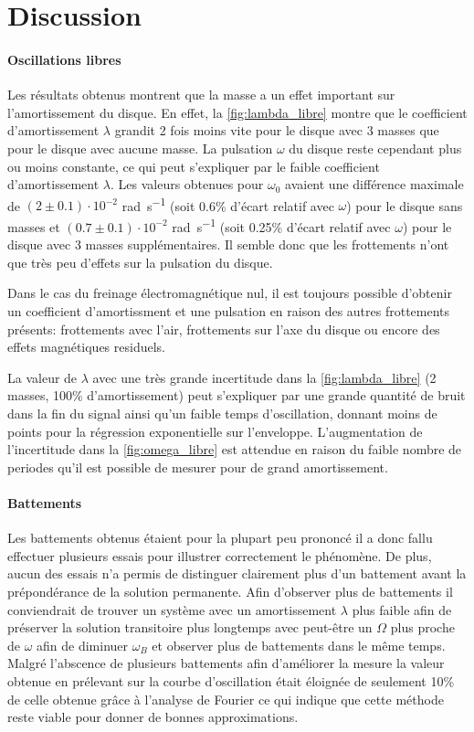 \section{Discussion}

\paragraph{Oscillations libres}
Les résultats obtenus montrent que la masse a un effet important sur l'amortissement du disque. En effet, la \autoref{fig:lambda_libre} montre que le coefficient d'amortissement \(\lambda\) grandit 2 fois moins vite pour le disque avec 3 masses que pour le disque avec aucune masse. La pulsation \(\omega\) du disque reste cependant plus ou moins constante, ce qui peut s'expliquer par le faible coefficient d'amortissement \(\lambda\). Les valeurs obtenues pour \(\omega_0\) avaient une différence maximale de \((2 \pm 0.1) \cdot 10^{-2}\) \si{\radian\per\second} (soit 0.6\% d'écart relatif avec \(\omega\)) pour le disque sans masses et \((0.7 \pm 0.1) \cdot 10^{-2}\) \si{\radian\per\second} (soit 0.25\% d'écart relatif avec \(\omega\)) pour le disque avec 3 masses supplémentaires. Il semble donc que les frottements n'ont que très peu d'effets sur la pulsation du disque.

Dans le cas du freinage électromagnétique nul, il est toujours possible d'obtenir un coefficient d'amortissment et une pulsation en raison des autres frottements présents: frottements avec l'air, frottements sur l'axe du disque ou encore des effets magnétiques residuels.

La valeur de \(\lambda\) avec une très grande incertitude dans la \autoref{fig:lambda_libre} (2 masses, 100\% d'amortissement) peut s'expliquer par une grande quantité de bruit dans la fin du signal ainsi qu'un faible temps d'oscillation, donnant moins de points pour la régression exponentielle sur l'enveloppe. L'augmentation de l'incertitude dans la \autoref{fig:omega_libre} est attendue en raison du faible nombre de periodes qu'il est possible de mesurer pour de grand amortissement.


\paragraph{Battements}
Les battements obtenus étaient pour la plupart peu prononcé il a donc fallu effectuer plusieurs essais pour illustrer correctement le phénomène. De plus, aucun des essais n'a permis de distinguer clairement plus d'un battement avant la prépondérance de la solution permanente. Afin d'observer plus de battements il conviendrait de trouver un système avec un amortissement $\lambda$ plus faible afin de préserver la solution transitoire plus longtemps avec peut-être un $\Omega$ plus proche de $\omega$ afin de diminuer $\omega_B$ et observer plus de battements dans le même temps. Malgré l'abscence de plusieurs battements afin d'améliorer la mesure la valeur obtenue en prélevant sur la courbe d'oscillation était éloignée de seulement 10\% de celle obtenue grâce à l'analyse de Fourier ce qui indique que cette méthode reste viable pour donner de bonnes approximations.

